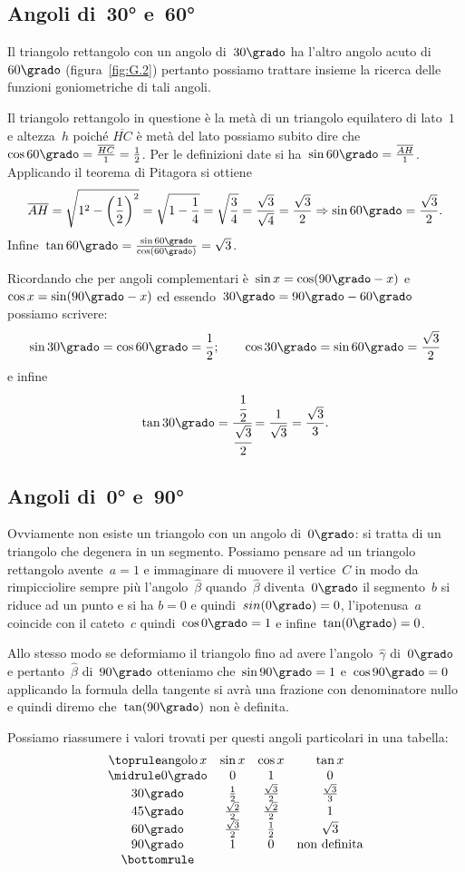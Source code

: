 \subsection{Angoli di~30° e~60°}
Il triangolo rettangolo con un angolo di~$30\grado$ ha l'altro angolo acuto 
di~$60\grado$ (figura~\ref{fig:G.2}) pertanto possiamo trattare insieme
la ricerca delle funzioni goniometriche di tali angoli.

Il triangolo rettangolo in questione è la metà di un triangolo equilatero di 
lato~$1$ e altezza~$h$ poiché $\overline{HC}$ è metà del lato
possiamo subito dire che~$\cos 60\grado=\frac{\overline{HC}}{1}=\frac{1}{2}$.
Per le definizioni date si ha~$\sin 60\grado=\frac{\overline{AH}}{1}$.
Applicando il teorema di Pitagora si ottiene
\[\overline{AH}=\sqrt{1^{2}-\left(\frac{1}{2}\right)^{2}}=\sqrt{1-\frac{1}{4}}=
\sqrt{\frac{3}{4}}=\frac{\sqrt{3}}{\sqrt{4}}=\frac{\sqrt{3}}{2}
\Rightarrow\sin 60\grado=\frac{\sqrt{3}}{2}.\]
Infine~$\tan 60\grado=\frac{\sin 60\grado}{\cos (60\grado)}=\sqrt{3}$.

Ricordando che per angoli complementari è~$\sin x=\cos (90\grado-x)$ 
e~$\cos x=\sin (90\grado-x)$
ed essendo~$30\grado=90\grado-60\grado$ possiamo scrivere:
\[\sin 30\grado=\cos 60\grado=\frac{1}{2}
;\qquad\cos 30\grado=\sin 60\grado=\frac{\sqrt{3}}{2}\]
e infine
\[\tan 30\grado=\cfrac{\cfrac{1}{2}}{\cfrac{\sqrt{3}}{2}}=\frac{1}{\sqrt{3}}
=\frac{\sqrt{3}}{3}.\]%

\subsection{Angoli di~0° e~90°}
Ovviamente non esiste un triangolo con un angolo di~$0\grado$: si tratta di un 
triangolo che degenera in un segmento.
Possiamo pensare ad un triangolo rettangolo avente~$a=1$ e immaginare di muovere 
il vertice~$C$ in modo da rimpicciolire
sempre più l'angolo~$\hat{\beta}$ quando~$\hat{\beta}$ diventa~$0\grado$ il 
segmento~$b$ si riduce ad un punto e si ha
$b=0$ e quindi~$sin(0\grado)=0$, l'ipotenusa~$a$ coincide con il cateto~$c$ 
quindi~$\cos 0\grado = 1$ e infine~$\tan(0\grado)=0$.

Allo stesso modo se deformiamo il triangolo fino ad avere 
l'angolo~$\hat{\gamma}$ di~$0\grado$ e pertanto~$\hat{\beta}$ di~$90\grado$ 
otteniamo
che~$\sin 90\grado = 1$ e~$\cos 90\grado = 0$ applicando la formula della tangente 
si avrà una frazione con denominatore nullo e
quindi diremo che~$\tan(90\grado)$ non è definita.

Possiamo riassumere i valori trovati per questi angoli particolari in una 
tabella:
\[
\begin{array}{cccc}
\toprule
\text{angolo}\, x & \sin x&\cos x & \tan x\\
\midrule
0\grado & 0 & 1 & 0\\
30\grado & \frac{1}{2} & \frac{\sqrt{3}}{2} & \frac{\sqrt{3}}{3}\\
45\grado & \frac{\sqrt{2}}{2} & \frac{\sqrt{2}}{2} & 1\\
60\grado & \frac{\sqrt{3}}{2} & \frac{1}{2} & \sqrt{3}\\
90\grado & 1 & 0 & \text{non definita}\\
\bottomrule
\end{array}
\]

